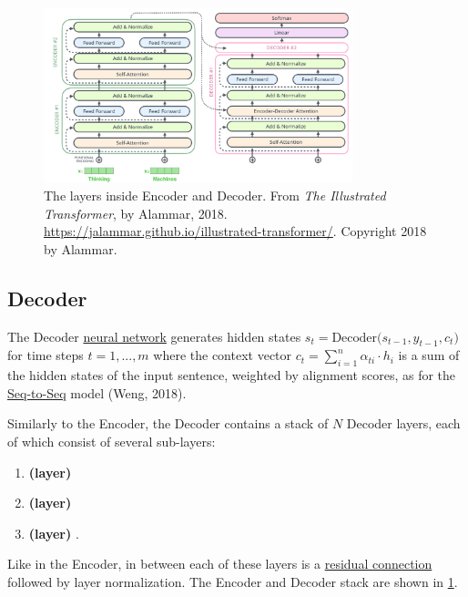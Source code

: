 \begin{figure}[h]
\vspace{-10pt}
\centering
\includegraphics[width=0.8\textwidth]{imgs/encoderDecoderLayersDetailed.png}
\vspace{-10pt}
\caption{\footnotesize The layers inside Encoder and Decoder. From \emph{The Illustrated Transformer}, by Alammar, 2018. \url{https://jalammar.github.io/illustrated-transformer/}. Copyright 2018 by Alammar.}
\vspace{-5pt}
\label{fig:encDecLayersDetailed}
\end{figure}




\subsection{Decoder} \label{sec:TransformerDecoder}


The Decoder \hyperref[sec:NeuralLM]{neural network} generates hidden states $s_t = \text{Decoder}\Big( s_{t-1}, y_{t-1}, c_t \Big)$ for time steps $t = 1,..., m$ where the context vector $c_t = \sum_{i=1}^n \alpha_{ti} \cdot h_i$ is a sum of the hidden states of the input sentence, weighted by alignment scores, as for the \hyperref[sec:Seq2Seq]{Seq-to-Seq} model (Weng, 2018). 

Similarly to the Encoder, the Decoder contains a stack of $N$ Decoder layers, each of which consist of several sub-layers:
\begin{enumerate}
    \item \textbf{  (layer)}
    \item \textbf{  (layer)} 
    \item \textbf{  (layer) }. 
\end{enumerate}

Like in the Encoder, in between each of these layers is a \hyperref[sec:ResidualConnections]{residual connection} followed by layer normalization. The Encoder and Decoder stack are shown in \cref{fig:encDecLayersDetailed}. 




